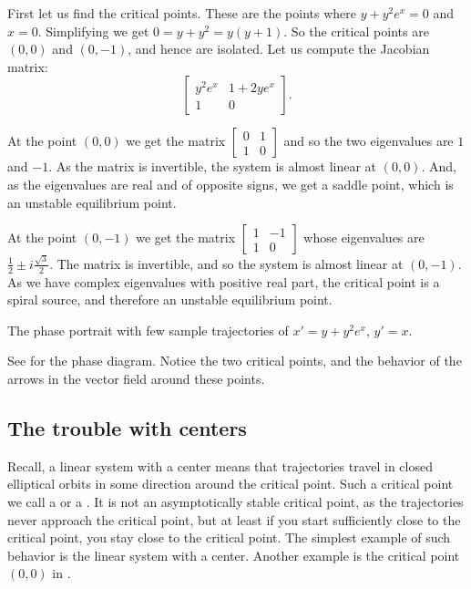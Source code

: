 \begin{exampleSol}
First let us find the critical points.  These are the points where
$y+y^2e^x = 0$ and $x=0$.  Simplifying we get $0=y+y^2 = y(y+1)$.  So the
critical points are $(0,0)$ and $(0,-1)$, and hence are isolated.  Let us
compute the Jacobian matrix:
\begin{equation*}
\begin{bmatrix}
y^2e^x & 1+2ye^x \\
1 & 0
\end{bmatrix}.
\end{equation*}

At the point $(0,0)$ we get the matrix
$\left[ \begin{smallmatrix} 0 & 1 \\ 1 & 0 \end{smallmatrix} \right]$ and
so the two eigenvalues are $1$ and $-1$.  As the matrix is invertible, the system is almost linear
at $(0,0)$.  And, as the eigenvalues are real
and of opposite signs, we get a saddle point, which is an unstable
equilibrium point.

At the point $(0,-1)$ we get the matrix
$\left[ \begin{smallmatrix} 1 & -1 \\ 1 & 0 \end{smallmatrix} \right]$ whose
eigenvalues are $\frac{1}{2} \pm i \frac{\sqrt{3}}{2}$.
The matrix is invertible, and so the system is almost linear at $(0,-1)$.
As we have complex eigenvalues with positive real part, the critical
point is a spiral source, and therefore an unstable equilibrium point.

\begin{myfig}
\capstart
{}
\caption{The phase portrait with few sample trajectories of 
$x'=y+y^2e^x$, $y'=x$.  \label{fig:nlin-ex813}}
\end{myfig}

See  for the phase diagram.  Notice the two
critical points, and the behavior of the arrows in the vector field around
these points.
\end{exampleSol}

\subsection{The trouble with centers}

Recall, a linear system with a center means that trajectories
travel in closed elliptical orbits
in some direction around the critical point.  Such
a critical point we call a \emph{} or
a \emph{}.  It is not an asymptotically 
stable critical point, as the trajectories never approach the critical
point, but at least if you start sufficiently close to the critical point,
you stay close to the critical point.  The simplest example of such
behavior is the linear system with a center.  Another
example is the critical point $(0,0)$ in
.

